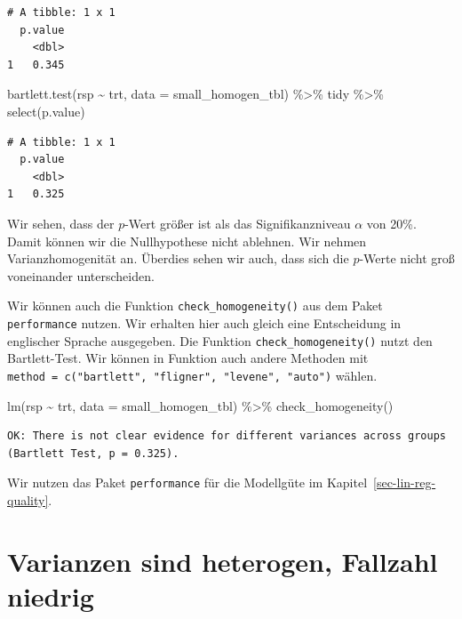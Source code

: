 \documentclass[
  letterpaper,
]{scrbook}
\newenvironment{Shaded}{\begin{snugshade}}{\end{snugshade}}
\newcommand{\AttributeTok}[1]{\textcolor[rgb]{0.40,0.45,0.13}{#1}}
\newcommand{\FunctionTok}[1]{\textcolor[rgb]{0.28,0.35,0.67}{#1}}
\newcommand{\NormalTok}[1]{\textcolor[rgb]{0.00,0.23,0.31}{#1}}
\newcommand{\SpecialCharTok}[1]{\textcolor[rgb]{0.37,0.37,0.37}{#1}}
\begin{document}
\begin{verbatim}
# A tibble: 1 x 1
  p.value
    <dbl>
1   0.345
\end{verbatim}

\begin{Shaded}
\begin{Highlighting}[]
\FunctionTok{bartlett.test}\NormalTok{(rsp }\SpecialCharTok{\textasciitilde{}}\NormalTok{ trt, }\AttributeTok{data =}\NormalTok{ small\_homogen\_tbl) }\SpecialCharTok{\%\textgreater{}\%}\NormalTok{ tidy }\SpecialCharTok{\%\textgreater{}\%} \FunctionTok{select}\NormalTok{(p.value)}
\end{Highlighting}
\end{Shaded}

\begin{verbatim}
# A tibble: 1 x 1
  p.value
    <dbl>
1   0.325
\end{verbatim}

Wir sehen, dass der \(p\)-Wert größer ist als das Signifikanzniveau
\(\alpha\) von 20\%. Damit können wir die Nullhypothese nicht ablehnen.
Wir nehmen Varianzhomogenität an. Überdies sehen wir auch, dass sich die
\(p\)-Werte nicht groß voneinander unterscheiden.

Wir können auch die Funktion \texttt{check\_homogeneity()} aus dem Paket
\texttt{performance} nutzen. Wir erhalten hier auch gleich eine
Entscheidung in englischer Sprache ausgegeben. Die Funktion
\texttt{check\_homogeneity()} nutzt den Bartlett-Test. Wir können in
Funktion auch andere Methoden mit
\texttt{method\ =\ c("bartlett",\ "fligner",\ "levene",\ "auto")}
wählen.

\begin{Shaded}
\begin{Highlighting}[]
\FunctionTok{lm}\NormalTok{(rsp }\SpecialCharTok{\textasciitilde{}}\NormalTok{ trt, }\AttributeTok{data =}\NormalTok{ small\_homogen\_tbl) }\SpecialCharTok{\%\textgreater{}\%} \FunctionTok{check\_homogeneity}\NormalTok{()}
\end{Highlighting}
\end{Shaded}

\begin{verbatim}
OK: There is not clear evidence for different variances across groups (Bartlett Test, p = 0.325).
\end{verbatim}

Wir nutzen das Paket \texttt{performance} für die Modellgüte im
Kapitel~\ref{sec-lin-reg-quality}.

\hypertarget{varianzen-sind-heterogen-fallzahl-niedrig}{%
\section{Varianzen sind heterogen, Fallzahl
niedrig}\label{varianzen-sind-heterogen-fallzahl-niedrig}}
\end{document}
